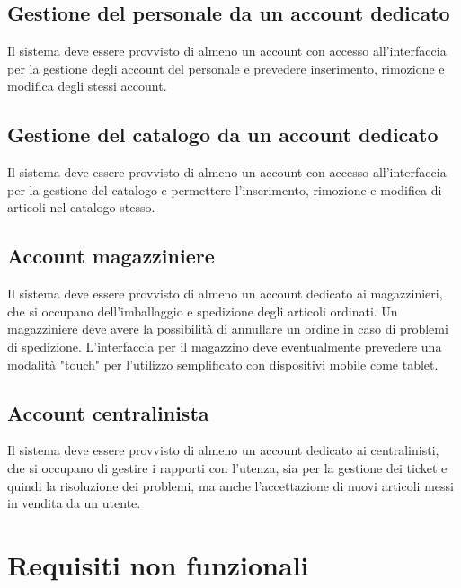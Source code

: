 \documentclass[12pt,a4paper]{article}
\begin{document}
\subsection{Gestione del personale da un account dedicato}
Il sistema deve essere provvisto di almeno un account con accesso all'interfaccia per la gestione degli account del personale e prevedere inserimento, rimozione e modifica degli stessi account.

\subsection{Gestione del catalogo da un account dedicato}
Il sistema deve essere provvisto di almeno un account con accesso all'interfaccia per la gestione del catalogo e permettere l'inserimento, rimozione e modifica di articoli nel catalogo stesso.

\subsection{Account magazziniere}
Il sistema deve essere provvisto di almeno un account dedicato ai magazzinieri, che si occupano dell'imballaggio e spedizione degli articoli ordinati. Un magazziniere deve avere la possibilità di annullare un ordine in caso di problemi di spedizione. L'interfaccia per il magazzino deve eventualmente prevedere una modalità "touch" per l'utilizzo semplificato con dispositivi mobile come tablet.

\subsection{Account centralinista}
Il sistema deve essere provvisto di almeno un account dedicato ai centralinisti, che si occupano di gestire i rapporti con l'utenza, sia per la gestione dei ticket e quindi la risoluzione dei problemi, ma anche l'accettazione di nuovi articoli messi in vendita da un utente.

\section{Requisiti non funzionali}
\end{document}
